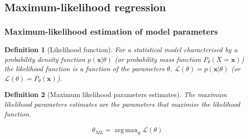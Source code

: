\documentclass[11pt]{beamer}
\newtheorem{probDef}{Definition}
\DeclareMathOperator*{\argmax}{arg\,max}
\begin{document}
\subsection{Maximum-likelihood regression}

\begin{frame}
    \frametitle{Maximum-likelihood estimation of model parameters}

	\scriptsize
    \begin{probDef}[Likelihood function]
        For a statistical model characterised by a probability density
        function $p(\mathbf{x}|\theta)$ (or probability mass function
        $P_\theta(X=\mathbf{x})$) the likelihood function is a function of the
        parameters $\theta$, $\mathcal{L}(\theta)=p(\mathbf{x}|\theta)$
        (or $\mathcal{L}(\theta)=P_\theta(\mathbf{x})$).
   \end{probDef}

    \begin{probDef}[Maximum likelihood parameters estimates]
        The maximum likelihood parameters estimates are the parameters that
        maximise the likelihood function.

        \begin{align*}
            \theta_{ML}=\argmax_{\theta}\mathcal{L}(\theta)
        \end{align*}
   \end{probDef}

	\normalsize

\end{frame}
\end{document}
